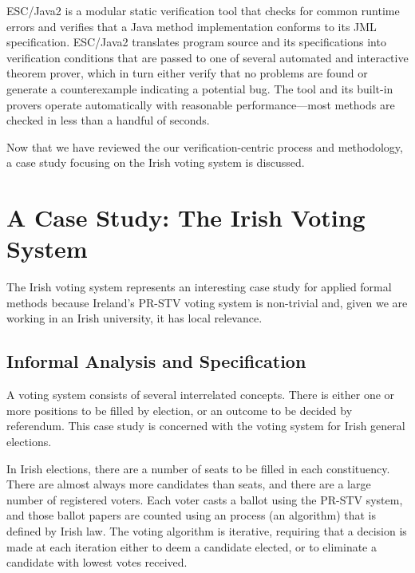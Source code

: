 \documentclass[letterpaper,twocolumn,10pt]{article}
\begin{document}
ESC/Java2 is a modular static verification tool that checks for common
runtime errors and verifies that a Java method implementation conforms
to its JML specification.  ESC/Java2 translates program source and its
specifications into verification conditions that are passed to one of
several automated and interactive theorem prover, which in turn either
verify that no problems are found or generate a counterexample
indicating a potential bug.  The tool and its built-in provers operate
automatically with reasonable performance---most methods are checked
in less than a handful of seconds.

\vspace{2pt}

Now that we have reviewed the our verification-centric process and
methodology, a case study focusing on the Irish voting system is
discussed.

\section{A Case Study: The Irish Voting System} 

The Irish voting system represents an interesting case study for
applied formal methods because Ireland's PR-STV voting system is
non-trivial and, given we are working in an Irish university, it has
local relevance.

\subsection{Informal Analysis and Specification}

A voting system consists of several interrelated concepts.  There is
either one or more positions to be filled by election, or an outcome to be 
decided by referendum.  This case study is concerned with the voting system
for Irish general elections.  

In Irish elections, there are a number of seats to be filled in each
constituency.  There are almost always more candidates than seats, and
there are a large number of registered voters.  Each voter casts a
ballot using the PR-STV system, and those ballot papers are counted
using an process (an algorithm) that is defined by Irish law.  The
voting algorithm is iterative, requiring that a decision is made at
each iteration either to deem a candidate elected, or to eliminate a
candidate with lowest votes received.
\end{document}
